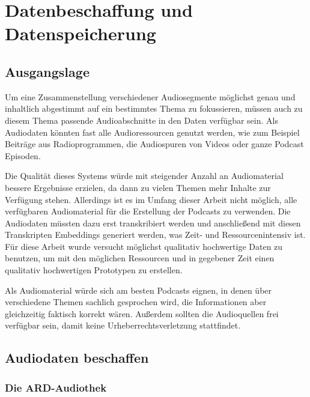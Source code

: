 \chapter{Datenbeschaffung und Datenspeicherung}\label{ch:data}

\section{Ausgangslage}

Um eine Zusammenstellung verschiedener Audiosegmente möglichst genau und inhaltlich abgestimmt auf ein bestimmtes Thema zu fokussieren, müssen auch zu diesem Thema passende Audioabschnitte in den Daten verfügbar sein.
Als Audiodaten könnten fast alle Audioressourcen genutzt werden, wie zum Beispiel Beiträge aus Radioprogrammen, die Audiospuren von Videos oder ganze Podcast Episoden.

Die Qualität dieses Systems würde mit steigender Anzahl an Audiomaterial bessere Ergebnisse erzielen, da dann zu vielen Themen mehr Inhalte zur Verfügung stehen.
Allerdings ist es im Umfang dieser Arbeit nicht möglich, alle verfügbaren Audiomaterial für die Erstellung der Podcasts zu verwenden.
Die Audiodaten müssten dazu erst transkribiert werden und anschließend mit diesen Transkripten Embeddings generiert werden, was Zeit- und Ressourcenintensiv ist.
Für diese Arbeit wurde versucht möglichst qualitativ hochwertige Daten zu benutzen, um mit den möglichen Ressourcen und in gegebener Zeit einen qualitativ hochwertigen Prototypen zu erstellen. 

Als Audiomaterial würde sich am besten Podcasts eignen, in denen über verschiedene Themen sachlich gesprochen wird, die Informationen aber gleichzeitig faktisch korrekt wären.
Außerdem sollten die Audioquellen frei verfügbar sein, damit keine Urheberrechtsverletzung stattfindet.


\section{Audiodaten beschaffen}

\subsection{Die ARD-Audiothek}

